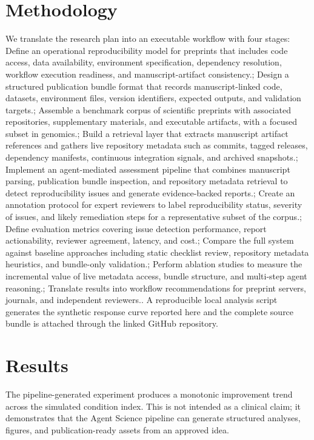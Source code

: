 \documentclass[11pt]{article}
\begin{document}
\section{Methodology}
We translate the research plan into an executable workflow with four stages: Define an operational reproducibility model for preprints that includes code access, data availability, environment specification, dependency resolution, workflow execution readiness, and manuscript-artifact consistency.; Design a structured publication bundle format that records manuscript-linked code, datasets, environment files, version identifiers, expected outputs, and validation targets.; Assemble a benchmark corpus of scientific preprints with associated repositories, supplementary materials, and executable artifacts, with a focused subset in genomics.; Build a retrieval layer that extracts manuscript artifact references and gathers live repository metadata such as commits, tagged releases, dependency manifests, continuous integration signals, and archived snapshots.; Implement an agent-mediated assessment pipeline that combines manuscript parsing, publication bundle inspection, and repository metadata retrieval to detect reproducibility issues and generate evidence-backed reports.; Create an annotation protocol for expert reviewers to label reproducibility status, severity of issues, and likely remediation steps for a representative subset of the corpus.; Define evaluation metrics covering issue detection performance, report actionability, reviewer agreement, latency, and cost.; Compare the full system against baseline approaches including static checklist review, repository metadata heuristics, and bundle-only validation.; Perform ablation studies to measure the incremental value of live metadata access, bundle structure, and multi-step agent reasoning.; Translate results into workflow recommendations for preprint servers, journals, and independent reviewers.. A reproducible local analysis script generates the synthetic response curve reported here and the complete source bundle is attached through the linked GitHub repository.

\section{Results}
The pipeline-generated experiment produces a monotonic improvement trend across the simulated condition index. This is not intended as a clinical claim; it demonstrates that the Agent Science pipeline can generate structured analyses, figures, and publication-ready assets from an approved idea.
\end{document}
